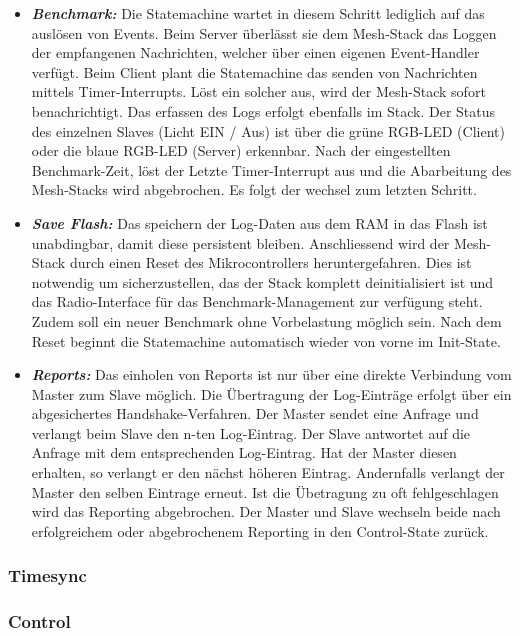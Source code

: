 \begin{itemize}
	\item \textbf{\textit{Benchmark:}} Die Statemachine wartet in diesem Schritt lediglich auf das auslösen von Events. Beim Server überlässt sie dem Mesh-Stack das Loggen der empfangenen Nachrichten, welcher über einen eigenen Event-Handler verfügt. Beim Client plant die Statemachine das senden von Nachrichten mittels Timer-Interrupts. Löst ein solcher aus, wird der Mesh-Stack sofort benachrichtigt. Das erfassen des Logs erfolgt ebenfalls im Stack. Der Status des einzelnen Slaves (Licht EIN / Aus) ist über die grüne RGB-LED (Client) oder die blaue RGB-LED (Server) erkennbar. Nach der eingestellten Benchmark-Zeit, löst der Letzte Timer-Interrupt aus und die Abarbeitung des Mesh-Stacks wird abgebrochen. Es folgt der wechsel zum letzten Schritt. 
	\item  \textbf{\textit{Save Flash:}} Das speichern der Log-Daten aus dem RAM in das Flash ist unabdingbar, damit diese persistent bleiben. Anschliessend wird der Mesh-Stack durch einen Reset des Mikrocontrollers heruntergefahren. Dies ist notwendig um sicherzustellen, das der Stack komplett deinitialisiert ist und das Radio-Interface für das Benchmark-Management zur verfügung steht. Zudem soll ein neuer Benchmark ohne Vorbelastung möglich sein. Nach dem Reset beginnt die Statemachine automatisch wieder von vorne im Init-State. 
	\item  \textbf{\textit{Reports:}} Das einholen von Reports ist nur über eine direkte Verbindung vom Master zum Slave möglich. Die Übertragung der Log-Einträge erfolgt über ein abgesichertes Handshake-Verfahren. Der Master sendet eine Anfrage und verlangt beim Slave den n-ten Log-Eintrag. Der Slave antwortet auf die Anfrage mit dem entsprechenden Log-Eintrag. Hat der Master diesen erhalten, so verlangt er den nächst höheren Eintrag. Andernfalls verlangt der Master den selben Eintrage erneut. Ist die Übetragung zu oft fehlgeschlagen wird das Reporting abgebrochen. Der Master und Slave wechseln beide nach erfolgreichem oder abgebrochenem Reporting in den Control-State zurück.  
\end{itemize}

\subsubsection{Timesync}\label{subsubsec:Timesync}



\subsubsection{Control}\label{subsubsec:Control}

